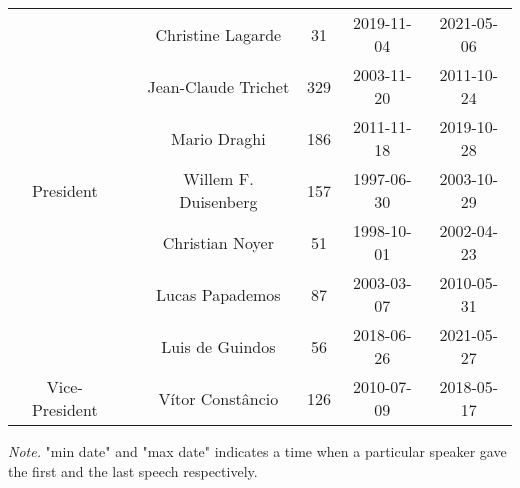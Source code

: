 \begin{table}[H]
{\begin{tabular}[h]{cccccc}
    \cmidrule{3-6}
     &  & Christine Lagarde & 31 & 2019-11-04 & 2021-05-06\\
    \cmidrule{3-6}
     &  & Jean-Claude Trichet & 329 & 2003-11-20 & 2011-10-24\\
    \cmidrule{3-6}
     &  & Mario Draghi & 186 & 2011-11-18 & 2019-10-28\\
    \cmidrule{3-6}
    \multirow{-5}{*}{\centering\arraybackslash President} & \multirow{-5}{*}{\centering\arraybackslash 710} & Willem F. Duisenberg & 157 & 1997-06-30 & 2003-10-29\\
    \cmidrule{1-6}
     &  & Christian Noyer & 51 & 1998-10-01 & 2002-04-23\\
    \cmidrule{3-6}
     &  & Lucas Papademos & 87 & 2003-03-07 & 2010-05-31\\
    \cmidrule{3-6}
     &  & Luis de Guindos & 56 & 2018-06-26 & 2021-05-27\\
    \cmidrule{3-6}
    \multirow{-4}{*}{\centering\arraybackslash Vice-President} & \multirow{-4}{*}{\centering\arraybackslash 320} & Vítor Constâncio & 126 & 2010-07-09 & 2018-05-17\\
    \bottomrule
    \end{tabular}}
    \label{tab:speechtable_descriptives}
    \begin{tablenotes}
    \item{\textit{Note.} "min date" and "max date" indicates a time when a particular speaker gave the first and the last speech respectively.}
    \end{tablenotes}
    \end{table}
    